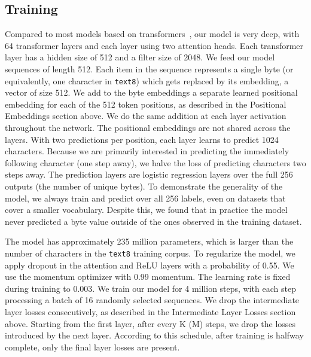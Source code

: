 \documentclass[letterpaper]{article}
\newcommand{\texteight}{\texttt{text8}}
\newcommand{\todo}[1]{{\footnotesize\color{red}{\textbf{#1}}}}
\newcommand{\comment}[1]{}
\begin{document}
\subsection{Training}

\comment{
\todo{Any discussion on less heads working better for some reason?}
}

Compared to most models based on transformers~\cite{NIPS2017_7181,DBLP:journals/corr/abs-1803-05573},
our model is very deep, with 64 transformer layers and each layer using two attention heads.
Each transformer layer has a hidden size of 512 and a filter size of 2048.
We feed our model sequences of length 512.
Each item in the sequence represents a single byte (or equivalently, one character in \texteight{}) which gets replaced by its embedding, a vector of size 512.
We add to the byte embeddings a separate learned positional embedding for each of the 512 token positions, as described in the Positional Embeddings section above.
We do the same addition at each layer activation throughout the network.
The positional embeddings are not shared across the layers.
With two predictions per position, each layer learns to predict 1024 characters.
Because we are primarily interested in predicting the immediately following character (one step away), we halve the loss of predicting characters two steps away.
The prediction layers are logistic regression layers over the full 256 outputs (the number of unique bytes). To demonstrate the generality of the model, we always train and predict over all 256 labels, even on datasets that cover a smaller vocabulary.
Despite this, we found that in practice the model never predicted a byte value outside of the ones observed in the training dataset.

The model has approximately 235 million parameters, which is larger than the number of characters in the \texteight{} training corpus.
To regularize the model, we apply dropout in the attention and ReLU layers with a probability of 0.55.
We use the momentum optimizer with 0.99 momentum.
The learning rate is fixed during training to 0.003.
We train our model for 4 million steps, with each step processing a batch of 16 randomly selected sequences.
We drop the intermediate layer losses consecutively, as described in the Intermediate Layer Losses section above.
Starting from the first layer, after every K (M) steps, we drop the losses introduced by the next layer.
According to this schedule, after training is halfway complete, only the final layer losses are present.
\end{document}
